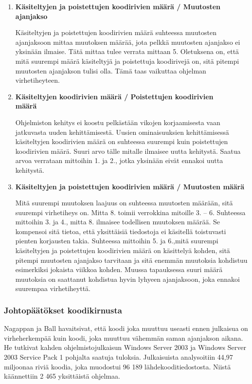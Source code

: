 \documentclass[finnish]{../tktltiki2}
\theoremstyle{definition}
\theoremstyle{remark}
\begin{document}
\begin{enumerate}
    \item {\bf Käsiteltyjen ja poistettujen koodirivien määrä / Muutosten ajanjakso}
    
    Käsiteltyjen ja poistettujen koodirivien määrä suhteessa muutosten ajanjaksoon mittaa muutoksen määrää, jota pelkkä 
    muutosten ajanjakso ei yksinään ilmaise. Tätä mittaa tulee verrata mittaan 5. Oletuksena on, että mitä suurempi 
    määrä käsiteltyjä ja poistettuja koodirivejä on, sitä pitempi muutosten ajanjakson tulisi olla. Tämä taas vaikuttaa 
    ohjelman virhetiheyteen.

    \item {\bf Käsiteltyjen koodirivien määrä / Poistettujen koodirivien\\määrä}
    
    Ohjelmiston kehitys ei koostu pelkästään vikojen korjaamisesta vaan jatkuvasta uuden kehittämisestä. Uusien 
    ominaisuuksien kehittämisessä käsiteltyjen koodirivien määrä on suhteessa suurempi kuin poistettujen koodirivien 
    määrä. Suuri arvo tälle mitalle ilmaisee uutta kehitystä. Saatua arvoa verrataan mittoihin 1. ja 2., jotka yksinään 
    eivät ennakoi uutta kehitystä.

    \item {\bf Käsiteltyjen ja poistettujen koodirivien määrä / Muutosten määrä}
    
    Mitä suurempi muutoksen laajuus on suhteessa muutosten määrään, sitä suurempi virhetiheys on. Mitta 8. toimii
    verrokkina mitoille 3. -- 6. Suhteessa mittoihin 3. ja 4., mitta 8. ilmaisee todellisen muutoksen määrää. Se
    kompensoi sitä tietoa, että yksittäisiä tiedostoja ei käsitellä toistuvasti pienten korjausten takia. Suhteessa 
    mittoihin 5. ja 6.,mitä suurempi käsiteltyjen ja poistettujen koodirivien määrä on käsittelyä kohden, sitä pitempi 
    muutosten ajanjakso tarvitaan ja sitä enemmän muutoksia kohdistuu esimerkiksi jokaista viikkoa kohden. Muussa 
    tapauksessa suuri määrä muutoksia on saattanut kohdistua hyvin lyhyeen ajanjaksoon, joka ennakoi suurempaa 
    virhetiheyttä.

\end{enumerate}

\subsubsection{Johtopäätökset koodikirnusta}

Nagappan ja Ball havaitsivat, että koodi joka muuttuu useasti ennen julkaisua on virheherkempää kuin koodi, joka muuttuu 
vähemmän saman ajanjakson aikana. He tutkivat kahden ohjelmistojulkaisun Windows Server 2003 ja Windows Server 2003 
Service Pack 1 pohjalta saatuja tuloksia. Julkaisuista analysoitiin 44,97 miljoonaa riviä koodia, joka muodostui 96 189 
lähdekooditiedostosta. Niistä käännettiin 2 465 yksittäistä ohjelmaa.\newline
\end{document}
